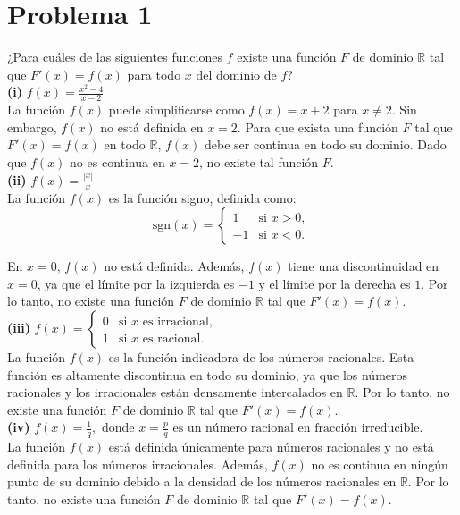 \section*{Problema 1}
¿Para cuáles de las siguientes funciones $f$ existe una función $F$ de dominio $\mathbb{R}$ tal que $F'(x) = f(x)$ para todo $x$ del dominio de $f$?\\

\textbf{(i)} $f(x) = \frac{x^2 - 4}{x - 2}$\\

La función $f(x)$ puede simplificarse como $f(x) = x + 2$ para $x \neq 2$. Sin embargo, $f(x)$ no está definida en $x = 2$. Para que exista una función $F$ tal que $F'(x) = f(x)$ en todo $\mathbb{R}$, $f(x)$ debe ser continua en todo su dominio. Dado que $f(x)$ no es continua en $x = 2$, no existe tal función $F$.\\

\textbf{(ii)} $f(x) = \frac{|x|}{x}$\\

La función $f(x)$ es la función signo, definida como:
\[
\text{sgn}(x) = \begin{cases}
1 & \text{si } x > 0, \\
-1 & \text{si } x < 0.
\end{cases}
\]

En $x = 0$, $f(x)$ no está definida. Además, $f(x)$ tiene una discontinuidad en $x = 0$, ya que el límite por la izquierda es $-1$ y el límite por la derecha es $1$. Por lo tanto, no existe una función $F$ de dominio $\mathbb{R}$ tal que $F'(x) = f(x)$.\\

\textbf{(iii)} $f(x) = \begin{cases} 0 & \text{si } x \text{ es irracional}, \\ 1 & \text{si } x \text{ es racional}. \end{cases}$\\

La función $f(x)$ es la función indicadora de los números racionales. Esta función es altamente discontinua en todo su dominio, ya que los números racionales y los irracionales están densamente intercalados en $\mathbb{R}$. Por lo tanto, no existe una función $F$ de dominio $\mathbb{R}$ tal que $F'(x) = f(x)$.\\

\textbf{(iv)} $f(x) = \frac{1}{q}, \text{ donde } x = \frac{p}{q} \text{ es un número racional en fracción irreducible.}$\\

La función $f(x)$ está definida únicamente para números racionales y no está definida para los números irracionales. Además, $f(x)$ no es continua en ningún punto de su dominio debido a la densidad de los números racionales en $\mathbb{R}$. Por lo tanto, no existe una función $F$ de dominio $\mathbb{R}$ tal que $F'(x) = f(x)$.